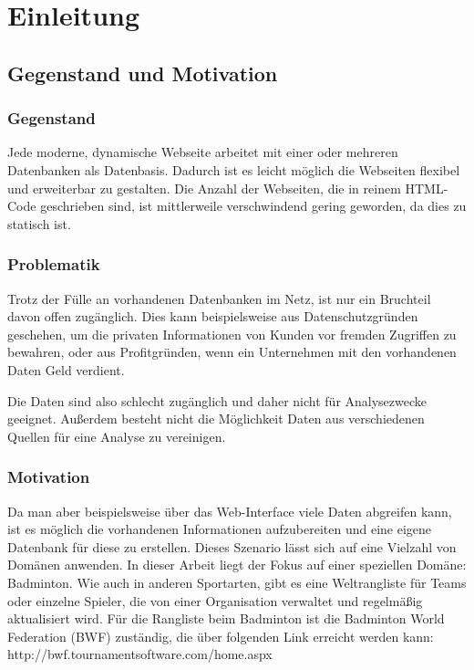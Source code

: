 \chapter{Einleitung}
\section{Gegenstand und Motivation}
\subsection{Gegenstand}
Jede moderne, dynamische Webseite arbeitet mit einer oder mehreren Datenbanken als Datenbasis. Dadurch ist es leicht möglich die Webseiten flexibel und erweiterbar zu gestalten. Die Anzahl der Webseiten, die in reinem HTML-Code geschrieben sind, ist mittlerweile verschwindend gering geworden, da dies zu statisch ist. 

\subsection{Problematik}
Trotz der Fülle an vorhandenen Datenbanken im Netz, ist nur ein Bruchteil davon offen zugänglich. Dies kann beispielsweise aus Datenschutzgründen geschehen, um die privaten Informationen von Kunden vor fremden Zugriffen zu bewahren, oder aus Profitgründen, wenn ein Unternehmen mit den vorhandenen Daten Geld verdient. 

Die Daten sind also schlecht zugänglich und daher nicht für Analysezwecke geeignet. Außerdem besteht nicht die Möglichkeit Daten aus verschiedenen Quellen für eine Analyse zu vereinigen. 

\subsection{Motivation}
Da man aber beispielsweise über das Web-Interface viele Daten abgreifen kann, ist es möglich die vorhandenen Informationen aufzubereiten und eine eigene Datenbank für diese zu erstellen. Dieses Szenario lässt sich auf eine Vielzahl von Domänen anwenden. In dieser Arbeit liegt der Fokus auf einer speziellen Domäne: Badminton. Wie auch in anderen Sportarten, gibt es eine Weltrangliste für Teams oder einzelne Spieler, die von einer Organisation verwaltet und regelmäßig aktualisiert wird. Für die Rangliste beim Badminton ist die Badminton World Federation (BWF) zuständig, die über folgenden Link erreicht werden kann: http://bwf.tournamentsoftware.com/home.aspx \cite{BWF2015}
\newpage

